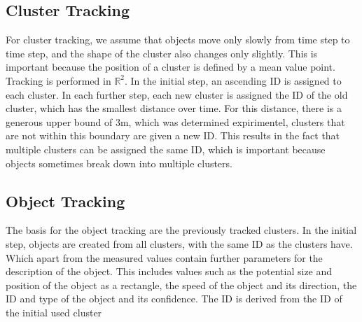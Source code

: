 \documentclass[11pt,oneside,openright]{mpreport}
\begin{document}
\subsection{Cluster Tracking}
For cluster tracking, we assume that objects move only slowly from time step to time step, and the shape of the cluster also changes only slightly. 
This is important because the position of a cluster is defined by a mean value point. Tracking is performed in $\mathbb{R}^2$. 
In the initial step, an ascending ID is assigned to each cluster.
In each further step, each new cluster is assigned the ID of the old cluster, which has the smallest distance over time.
For this distance, there is a generous upper bound of 3m, which was determined expirimentel, clusters that are not within this boundary are given a new ID.
This results in the fact that multiple clusters can be assigned the same ID, which is important because objects sometimes break down into multiple clusters.

\subsection{Object Tracking}
The basis for the object tracking are the previously tracked clusters. In the initial step, objects are created from all clusters, with the same ID as the clusters have.
Which apart from the measured values contain further parameters for the description of the object. This includes values such as the potential size and 
position of the object as a rectangle, the speed of the object and its direction, the ID and type of the object and its confidence. The ID is derived from the ID of the initial used cluster
\end{document}
